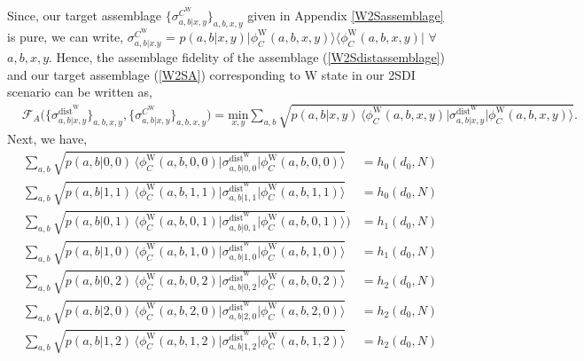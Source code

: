 \documentclass[reprint,superscriptaddress,nofootinbib,amsmath,amssymb,aps,pra,longbibliography]{revtex4-1}
\begin{document}
\begin{widetext}
Since, our target assemblage $\{\sigma_{a,b|x,y}^{C^{\text{W}}} \}_{a,b,x,y}$ given in Appendix \ref{W2Sassemblage} is pure, we can write, $\sigma_{a,b|x.y}^{C^{\text{W}}}$ = $p(a,b|x,y) \Big| \phi_{C}^{\text{W}} (a,b, x,y) \Big\rangle \Big\langle \phi_{C}^{\text{W}} (a,b, x,y) \Big|$ $\forall$ $a,b,x,y$. Hence, the assemblage fidelity of the assemblage (\ref{W2Sdistassemblage}) and our target assemblage (\ref{W2SA}) corresponding to W state in our 2SDI scenario can be written as,
\begin{align}
    &\mathcal{F}_A \Big(\{\sigma_{a,b|x,y}^{\text{dist}^{\text{W}}}\}_{a,b,x,y}, \{\sigma_{a,b|x,y}^{C^{\text{W}}}\}_{a,b,x,y} \Big) = \underset{x,y}{\mathrm{min}} \sum_{a,b} \sqrt{p(a,b|x,y) \, \Big\langle \phi_{C}^{\text{W}} (a,b, x,y) \Big| \sigma_{a,b|x,y}^{\text{dist}^{\text{W}}} \Big| \phi_{C}^{\text{W}} (a,b, x,y) \Big\rangle}.
     \label{assfidw1app2sdi}
\end{align}
Next, we have,
\begin{align}
	\sum_{a,b} \sqrt{p(a,b|0,0) \, \Big\langle \phi_{C}^{\text{W}} (a,b, 0,0) \Big| \sigma_{a,b|0,0}^{\text{dist}^{\text{W}}} \Big| \phi_{C}^{\text{W}} (a,b, 0,0) \Big\rangle} &= h_0(d_0,N) \label{www1} \\
	\sum_{a,b} \sqrt{p(a,b|1,1) \, \Big\langle \phi_{C}^{\text{W}} (a,b, 1,1) \Big| \sigma_{a,b|1,1}^{\text{dist}^{\text{W}}} \Big| \phi_{C}^{\text{W}} (a,b, 1,1) \Big\rangle} &= h_0(d_0,N)  \label{www2} \\
	 \sum_{a,b} \sqrt{p(a,b|0,1) \, \Big\langle \phi_{C}^{\text{W}} (a,b, 0,1) \Big| \sigma_{a,b|0,1}^{\text{dist}^{\text{W}}} \Big| \phi_{C}^{\text{W}} (a,b, 0,1) \Big\rangle}) &= h_1(d_0,N) \label{www3} \\ 
	 \sum_{a,b} \sqrt{p(a,b|1,0) \, \Big\langle \phi_{C}^{\text{W}} (a,b, 1,0) \Big| \sigma_{a,b|1,0}^{\text{dist}^{\text{W}}} \Big| \phi_{C}^{\text{W}} (a,b, 1,0) \Big\rangle} 	&= h_1(d_0,N) \label{www4}\\
	\sum_{a,b} \sqrt{p(a,b|0,2) \, \Big\langle \phi_{C}^{\text{W}} (a,b, 0,2) \Big| \sigma_{a,b|0,2}^{\text{dist}^{\text{W}}} \Big| \phi_{C}^{\text{W}} (a,b, 0,2) \Big\rangle}&= h_2(d_0,N) \label{www5} \\
	\sum_{a,b} \sqrt{p(a,b|2,0) \, \Big\langle \phi_{C}^{\text{W}} (a,b, 2,0) \Big| \sigma_{a,b|2,0}^{\text{dist}^{\text{W}}} \Big| \phi_{C}^{\text{W}} (a,b, 2,0) \Big\rangle} &= h_2(d_0,N) \label{www6} \\
	\sum_{a,b} \sqrt{p(a,b|1,2) \, \Big\langle \phi_{C}^{\text{W}} (a,b, 1,2) \Big| \sigma_{a,b|1,2}^{\text{dist}^{\text{W}}} \Big| \phi_{C}^{\text{W}} (a,b, 1,2) \Big\rangle} &= h_2(d_0,N) \label{www7} \\

\end{align}
\end{widetext}
\end{document}
